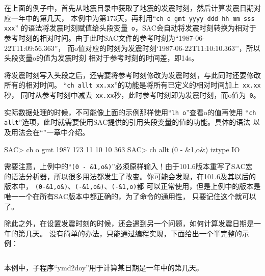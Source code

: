 在上面的例子中，首先从地震目录中获取了地震的发震时刻，然后计算发震日期对应一年中的第几天，
本例中为第173天，再利用``\verb+ch o gmt yyyy ddd hh mm sss xxx+''
的语法将发震时刻赋值给头段变量~\verb+o+，SAC会自动将发震时刻转换为相对于
参考时刻的相对时间。由于此时SAC文件的参考时刻为``1987-06-22T11:09:56.363''，
而o值对应的时刻为发震时刻`1987-06-22T11:10:10.363''，所以头段变量o的值为发震时刻
相对于参考时刻的时间差，即14s。

将发震时刻写入头段之后，还需要将参考时刻修改为发震时刻，与此同时还要修改所有的相对时间。
``\verb+ch allt xx.xx+''的功能是将所有已定义的相对时间加上~\verb+xx.xx+秒，
同时从参考时刻中减去~\verb+xx.xx+秒，此时参考时刻即为发震时刻，而o值为~\verb+0+。

实际数据处理的时候，不可能像上面的示例那样使用``\verb+lh o+''查看o的值再使用
``\verb+ch allt+''选项，此时就需要使用SAC提供的引用头段变量的值的功能。具体的语法
以及用法会在``''一章中介绍。

\begin{SACCode}
SAC> ch o gmt 1987 173 11 10 10 363
SAC> ch allt (0 - &1,o&) iztype IO
\end{SACCode}

需要注意，上例中的``\verb+(0 - &1,o&)+''必须原样输入！由于101.6版本重写了SAC宏
的语法分析器，所以很多用法都发生了改变。你可能会发现，在101.6及其以后的版本中，
\verb+(0-&1,o&)+、\verb+(-&1,o&)+、\verb+(-&1,o)+都
可以正常使用，但是上例中的版本是唯一一个在所有SAC版本中都正确的，为了命令的通用性，
只要记住这个就可以了。

除此之外，在设置发震时刻的时候，还会遇到另一个问题，如何计算发震日期是一年的第几天。
没有简单的办法，只能通过编程实现，下面给出一个半完整的示例：
\inputminted{perl}{./data-process/ch-origin.pl}
本例中，子程序``ymd2doy''用于计算某日期是一年中的第几天。
